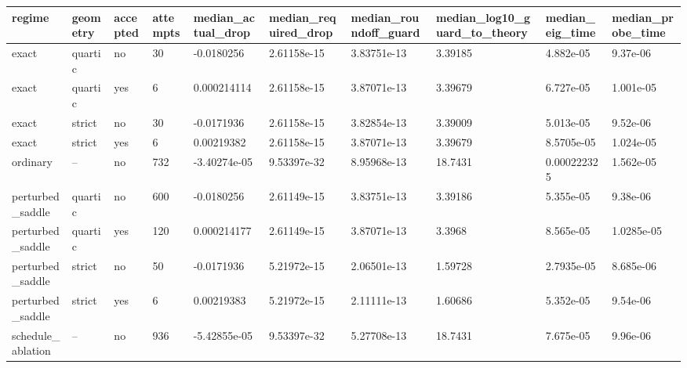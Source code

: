 \begin{tabular}{llllllllll}
\toprule
regime & geometry & accepted & attempts & median\_actual\_drop & median\_required\_drop & median\_roundoff\_guard & median\_log10\_guard\_to\_theory & median\_eig\_time & median\_probe\_time \\
\midrule
exact & quartic & no & 30 & -0.0180256 & 2.61158e-15 & 3.83751e-13 & 3.39185 & 4.882e-05 & 9.37e-06 \\
exact & quartic & yes & 6 & 0.000214114 & 2.61158e-15 & 3.87071e-13 & 3.39679 & 6.727e-05 & 1.001e-05 \\
exact & strict & no & 30 & -0.0171936 & 2.61158e-15 & 3.82854e-13 & 3.39009 & 5.013e-05 & 9.52e-06 \\
exact & strict & yes & 6 & 0.00219382 & 2.61158e-15 & 3.87071e-13 & 3.39679 & 8.5705e-05 & 1.024e-05 \\
ordinary & -- & no & 732 & -3.40274e-05 & 9.53397e-32 & 8.95968e-13 & 18.7431 & 0.000222325 & 1.562e-05 \\
perturbed\_saddle & quartic & no & 600 & -0.0180256 & 2.61149e-15 & 3.83751e-13 & 3.39186 & 5.355e-05 & 9.38e-06 \\
perturbed\_saddle & quartic & yes & 120 & 0.000214177 & 2.61149e-15 & 3.87071e-13 & 3.3968 & 8.565e-05 & 1.0285e-05 \\
perturbed\_saddle & strict & no & 50 & -0.0171936 & 5.21972e-15 & 2.06501e-13 & 1.59728 & 2.7935e-05 & 8.685e-06 \\
perturbed\_saddle & strict & yes & 6 & 0.00219383 & 5.21972e-15 & 2.11111e-13 & 1.60686 & 5.352e-05 & 9.54e-06 \\
schedule\_ablation & -- & no & 936 & -5.42855e-05 & 9.53397e-32 & 5.27708e-13 & 18.7431 & 7.675e-05 & 9.96e-06 \\
\bottomrule
\end{tabular}
